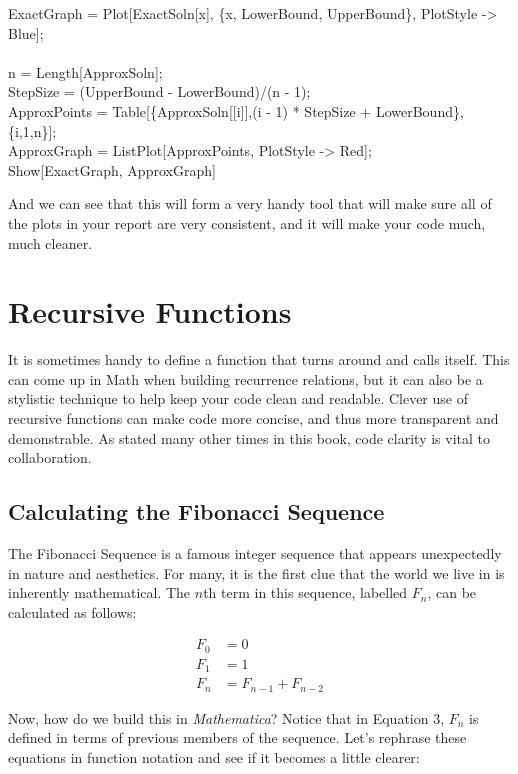 \begin{code}
	   ExactGraph = Plot[ExactSoln[x], \{x, LowerBound, UpperBound\}, PlotStyle -> Blue];\\
	   \\
	   n = Length[ApproxSoln];\\
	   StepSize = (UpperBound - LowerBound)/(n - 1);\\
	   ApproxPoints = Table[\{ApproxSoln[[i]],(i - 1) * StepSize + LowerBound\},\{i,1,n\}];\\
	   ApproxGraph = ListPlot[ApproxPoints, PlotStyle -> Red];\\
	   Show[ExactGraph, ApproxGraph]
\end{code}

And we can see that this will form a very handy tool that will make sure all of the plots in your report are very consistent, and it will make your code much, much cleaner.

\section{Recursive Functions}

It is sometimes handy to define a function that turns around and calls itself. This can come up in Math when building recurrence relations, but it can also be a stylistic technique to help keep your code clean and readable. Clever use of recursive functions can make code more concise, and thus more transparent and demonstrable. As stated many other times in this book, code clarity is vital to collaboration.

\subsection{Calculating the Fibonacci Sequence} 

The Fibonacci Sequence is a famous integer sequence that appears unexpectedly in nature and aesthetics. For many, it is the first clue that the world we live in is inherently mathematical. The $n$th term in this sequence, labelled $F_n$, can be calculated as follows:

\begin{align} 
	   F_0 &= 0 \\
	   F_1 &= 1 \\
	   F_n &= F_{n - 1} + F_{n - 2}
\end{align}

Now, how do we build this in \emph{Mathematica}? Notice that in Equation 3, $F_n$ is defined in terms of previous members of the sequence. Let's rephrase these equations in function notation and see if it becomes a little clearer:

